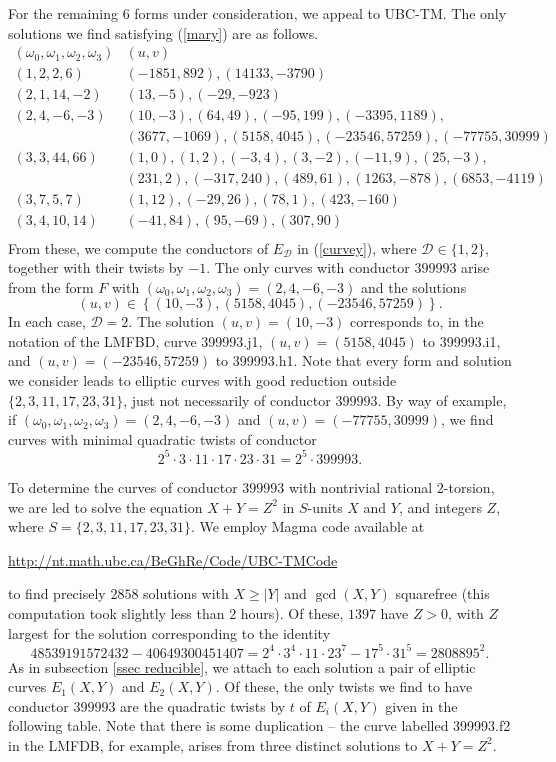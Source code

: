 For the remaining $6$ forms under consideration, we appeal to UBC-TM. The only solutions we find satisfying (\ref{mary})
are as follows.
$$
\begin{array}{c|c} 
(\omega_0,\omega_1,\omega_2,\omega_3) & (u,v) \\ \hline
(1, 2, 2, 6) & (-1851, 892), (14133, -3790) \\
(2, 1, 14, -2) & (13, -5), (-29, -923) \\
(2, 4, -6, -3) & (10,-3), (64, 49), (-95, 199), (-3395, 1189), \\
& (3677, -1069), (5158, 4045), (-23546, 57259),  (-77755, 30999) \\
(3,3,44,66) & (1,0), (1,2), (-3,4), (3,-2), (-11,9), (25,-3), \\
& (231,2), (-317,240), (489,61), (1263, -878), (6853, -4119) \\
(3, 7, 5, 7) & (1, 12), (-29, 26), (78, 1),  (423, -160) \\
(3, 4, 10, 14) & (-41, 84), (95, -69), (307, 90) \\
\end{array}
$$ 
From these, we compute the conductors of $E_{\mathcal{D}}$ in (\ref{curvey}), where $\mathcal{D} \in \{ 1, 2 \}$, together with their twists by $-1$.
The only curves with conductor $399993$ arise from the form $F$ with $(\omega_0,\omega_1,\omega_2,\omega_3)=(2,4,-6,-3)$ and the solutions
$$
(u,v) \in \left\{ (10,-3), (5158,4045),  (-23546, 57259) \right\}.
$$
In each case, $\mathcal{D}=2$. The solution $(u,v)=(10,-3)$ corresponds to, in the notation of the LMFBD, curve 399993.j1, $(u,v)=(5158,4045)$ to 399993.i1, and $(u,v)=(-23546, 57259)$ to 399993.h1. Note that every form and solution we consider leads to elliptic curves with good reduction outside $\{ 2, 3, 11, 17, 23, 31 \}$, just not necessarily of  conductor $399993$. By way of example, if $(\omega_0,\omega_1,\omega_2,\omega_3) =(2, 4, -6, -3)$ and $(u,v)=(-77755, 30999)$, we find curves with minimal quadratic twists of conductor 
$$
2^5 \cdot 3 \cdot 11 \cdot 17 \cdot 23 \cdot 31 = 2^5 \cdot 399993.
$$

To determine the curves of conductor $399993$ with nontrivial rational $2$-torsion, we are led to solve the equation $X+Y=Z^2$ in $S$-units $X$ and $Y$, and integers $Z$, where $S=\{2,3,11,17,23,31 \}$.
We employ Magma code available at
\begin{center}
\url{http://nt.math.ubc.ca/BeGhRe/Code/UBC-TMCode}
\end{center}
to find precisely $2858$ solutions with $X \geq |Y|$ and  $\gcd (X,Y)$ squarefree (this computation took slightly less than $2$ hours). Of these, $1397$ have $Z > 0$, with $Z$ largest for the solution corresponding to the identity
$$
48539191572432 - 40649300451407 = 2^4 \cdot 3^4 \cdot 11 \cdot 23^7 - 17^5 \cdot 31^5 = 2808895^2.
$$
As in subsection \ref{ssec reducible}, we attach to each solution a pair of elliptic curves $E_1(X,Y)$ and $E_2(X,Y)$.
Of these, the only twists we find to have conductor $399993$ are the quadratic twists by $t$ of $E_i(X,Y)$  given in the following table. Note that there is some duplication -- the curve labelled 399993.f2 in the LMFDB, for example, arises from three distinct solutions to $X+Y=Z^2$.


